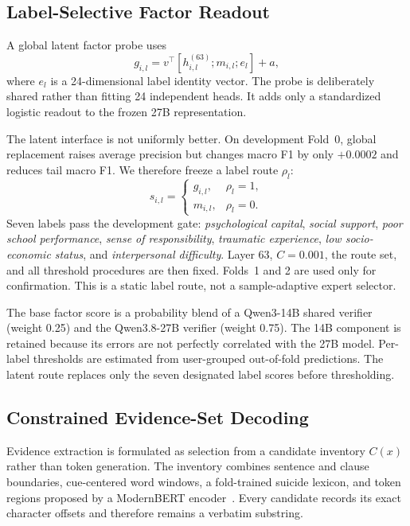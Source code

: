 \documentclass[conference]{IEEEtran}
\begin{document}
\subsection{Label-Selective Factor Readout}
A global latent factor probe uses
\begin{equation}
g_{i,l}=v^\top[h_{i,l}^{(63)};m_{i,l};e_l]+a,
\end{equation}
where $e_l$ is a 24-dimensional label identity vector. The probe is deliberately shared rather than fitting 24 independent heads. It adds only a standardized logistic readout to the frozen 27B representation.

The latent interface is not uniformly better. On development Fold~0, global replacement raises average precision but changes macro F1 by only $+0.0002$ and reduces tail macro F1. We therefore freeze a label route $\rho_l$:
\begin{equation}
s_{i,l}=\begin{cases}
g_{i,l}, & \rho_l=1,\\
m_{i,l}, & \rho_l=0.
\end{cases}
\end{equation}
Seven labels pass the development gate: \emph{psychological capital}, \emph{social support}, \emph{poor school performance}, \emph{sense of responsibility}, \emph{traumatic experience}, \emph{low socio-economic status}, and \emph{interpersonal difficulty}. Layer 63, $C=0.001$, the route set, and all threshold procedures are then fixed. Folds~1 and 2 are used only for confirmation. This is a static label route, not a sample-adaptive expert selector.

The base factor score is a probability blend of a Qwen3-14B shared verifier~\cite{qwen3report} (weight 0.25) and the Qwen3.8-27B verifier (weight 0.75). The 14B component is retained because its errors are not perfectly correlated with the 27B model. Per-label thresholds are estimated from user-grouped out-of-fold predictions. The latent route replaces only the seven designated label scores before thresholding.

\subsection{Constrained Evidence-Set Decoding}
Evidence extraction is formulated as selection from a candidate inventory $C(x)$ rather than token generation. The inventory combines sentence and clause boundaries, cue-centered word windows, a fold-trained suicide lexicon, and token regions proposed by a ModernBERT encoder~\cite{warner2025modernbert}. Every candidate records its exact character offsets and therefore remains a verbatim substring.
\end{document}
